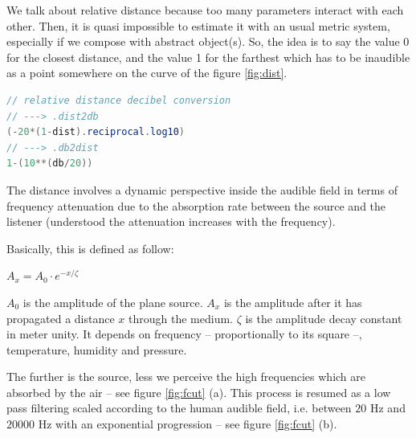 \documentclass{book}
\begin{document}
We talk about relative distance because too many parameters interact with each other. Then, it is quasi impossible to estimate it with an usual metric system, especially if we compose with abstract object(s). So, the idea is to say the value 0 for the closest distance, and the value 1 for the farthest which has to be inaudible as a point somewhere on the curve of the figure \ref{fig:dist}. 

\bigskip

\begin{lstlisting}[basicstyle=\footnotesize\ttfamily,language=java]
// relative distance decibel conversion
// ---> .dist2db
(-20*(1-dist).reciprocal.log10)
// ---> .db2dist
1-(10**(db/20))
\end{lstlisting}

\bigskip

The distance involves a dynamic perspective inside the audible field in terms of frequency attenuation due to the absorption rate between the source and the listener (understood the attenuation increases with the frequency). 

Basically, this is defined as follow:

\bigskip

$A_x=A_0\cdot e^{- x/\zeta}$ 

\bigskip

$A_0$ is the amplitude of the plane source. $A_x$ is the amplitude after it has propagated a distance $x$ through the medium.
$\zeta$ is the amplitude decay constant in meter unity. It depends on frequency -- proportionally to its square --, temperature, humidity and pressure.

\bigskip

The further is the source, less we perceive the high frequencies which are absorbed by the air -- see figure \ref{fig:fcut} (a). This process is resumed as a low pass filtering scaled according to the human audible field, i.e. between $20$ Hz and $20000$ Hz with an exponential progression -- see figure \ref{fig:fcut} (b).
\end{document}
